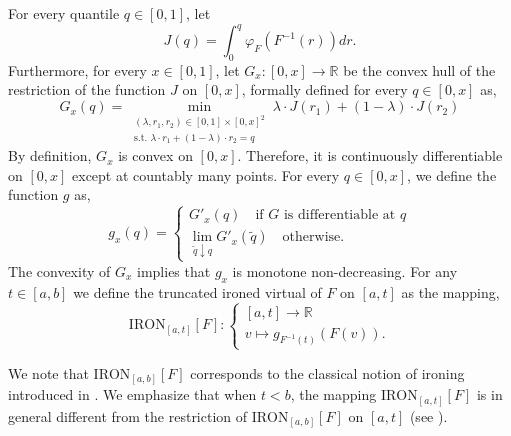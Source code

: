 For every quantile $q \in [0,1]$, let
\begin{equation}
\label{eq:J}
    J(q) = \int_0^q \varphi_{F}(F^{-1}(r)) dr.
\end{equation}
Furthermore, for every $x \in [0,1]$, let $G_x:[0,x] \to \mathbb{R}$ be the convex hull of the restriction of the function $J$ on $[0,x]$, formally defined for every $q \in [0,x]$ as,
\begin{equation*}
    G_x(q) = \min_{ \substack{(\lambda,r_1,r_2) \in [0,1]\times[0,x]^2\\ \text{s.t. } \lambda \cdot r_1 + (1-\lambda) \cdot r_2 = q} } \lambda \cdot J(r_1) + (1-\lambda) \cdot J(r_2) 
\end{equation*}
By definition, $G_x$ is convex on $[0,x]$. Therefore, it is continuously differentiable on $[0,x]$ except at countably many points. For every $q \in [0,x]$, we define the function $g$ as,
\begin{equation*}
    g_x(q) = \begin{cases}
        G'_x(q) \quad \text{if $G$ is differentiable at $q$}\\
        \lim_{\tilde{q} \downarrow q} G'_x(\tilde{q}) \quad \text{otherwise.}
    \end{cases}
\end{equation*}
The convexity of $G_x$ implies that $g_x$ is monotone non-decreasing. For any $t \in [a,b]$ we define the truncated ironed virtual of $F$ on $[a,t]$ as the mapping,
\begin{equation*}
    \mathrm{IRON}_{[a,t]}[F] : \begin{cases}
        [a,t] \to \mathbb{R}\\
        v \mapsto g_{F^{-1}(t)}(F(v)).
    \end{cases}
\end{equation*}


We note that $\mathrm{IRON}_{[a,b]}[F]$ corresponds to the classical notion of ironing introduced in \citet{myerson1981optimal}. We emphasize that when $t < b$, the mapping $\mathrm{IRON}_{[a,t]}[F]$ is in general different from the restriction of $\mathrm{IRON}_{[a,b]}[F]$ on $[a,t]$ (see ). 

